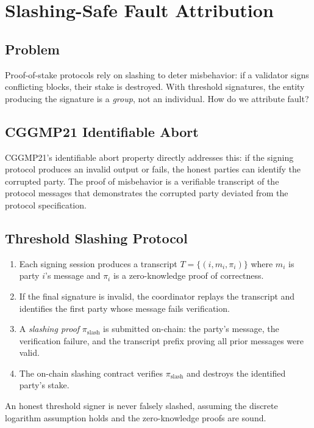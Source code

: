 \section{Slashing-Safe Fault Attribution}

\label{sec:slashing}

\subsection{Problem}

Proof-of-stake protocols rely on slashing to deter misbehavior: if a validator signs
conflicting blocks, their stake is destroyed. With threshold signatures, the entity
producing the signature is a \emph{group}, not an individual. How do we attribute
fault?

\subsection{CGGMP21 Identifiable Abort}

CGGMP21's identifiable abort property directly addresses this: if the signing protocol
produces an invalid output or fails, the honest parties can identify the corrupted
party. The proof of misbehavior is a verifiable transcript of the protocol messages
that demonstrates the corrupted party deviated from the protocol specification.

\subsection{Threshold Slashing Protocol}

\begin{enumerate}[leftmargin=2em]
  \item Each signing session produces a transcript $T = \{(i, m_i, \pi_i)\}$ where
        $m_i$ is party $i$'s message and $\pi_i$ is a zero-knowledge proof of
        correctness.
  \item If the final signature is invalid, the coordinator replays the transcript
        and identifies the first party whose message fails verification.
  \item A \emph{slashing proof} $\pi_{\text{slash}}$ is submitted on-chain:
        the party's message, the verification failure, and the transcript prefix
        proving all prior messages were valid.
  \item The on-chain slashing contract verifies $\pi_{\text{slash}}$ and destroys
        the identified party's stake.
\end{enumerate}

\begin{proposition}
An honest threshold signer is never falsely slashed, assuming the discrete logarithm
assumption holds and the zero-knowledge proofs are sound.
\end{proposition}

